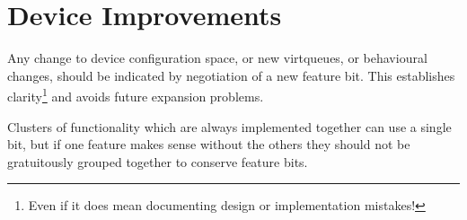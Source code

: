 \section{Device Improvements}\label{sec:Creating New Device Types / Device Improvements}

Any change to device configuration space, or new virtqueues, or
behavioural changes, should be indicated by negotiation of a new
feature bit. This establishes clarity\footnote{Even if it does mean documenting design or implementation
mistakes!
} and avoids future expansion problems.

Clusters of functionality which are always implemented together
can use a single bit, but if one feature makes sense without the
others they should not be gratuitously grouped together to
conserve feature bits.


